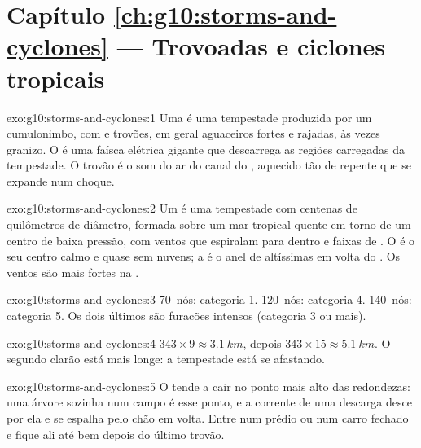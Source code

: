 \section*{Capítulo \ref{ch:g10:storms-and-cyclones} --- Trovoadas e ciclones tropicais}

\begin{solution}{exo:g10:storms-and-cyclones:1}
Uma  é uma tempestade produzida por um cumulonimbo, com  e
trovões, em geral aguaceiros fortes e rajadas, às vezes granizo. O  é
uma faísca elétrica gigante que descarrega as regiões carregadas da
tempestade. O trovão é o som do ar do canal do , aquecido tão de repente
que se expande num choque.
\end{solution}

\begin{solution}{exo:g10:storms-and-cyclones:2}
Um  é uma tempestade com centenas de quilômetros de
diâmetro, formada sobre um mar tropical quente em torno de um centro de
baixa pressão, com ventos que espiralam para dentro e faixas de .
O  é o seu centro calmo e quase sem nuvens; a  é o anel de
 altíssimas em volta do . Os ventos são mais fortes na .
\end{solution}

\begin{solution}{exo:g10:storms-and-cyclones:3}
\num{70}~nós: categoria 1. \num{120}~nós: categoria 4.
\num{140}~nós: categoria 5. Os dois últimos são furacões intensos
(categoria 3 ou mais).
\end{solution}

\begin{solution}{exo:g10:storms-and-cyclones:4}
$343 \times 9 \approx \qty{3.1}{km}$, depois $343 \times 15 \approx
\qty{5.1}{km}$. O segundo clarão está mais longe: a tempestade está se
afastando.
\end{solution}

\begin{solution}{exo:g10:storms-and-cyclones:5}
O  tende a cair no ponto mais alto das redondezas: uma árvore sozinha
num campo é esse ponto, e a corrente de uma descarga desce por ela e se
espalha pelo chão em volta. Entre num prédio ou num carro fechado e fique ali
até bem depois do último trovão.
\end{solution}

